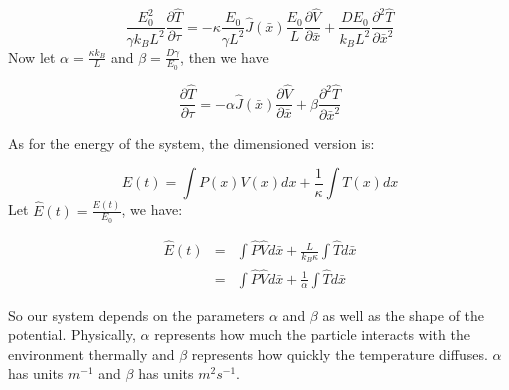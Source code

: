 \begin{equation}
\frac{E_0^2}{\gamma k_B L^2} \frac{\partial \hat{T}}{\partial \tau} = -\kappa \frac{E_0}{\gamma L^2}\hat{J}(\bar{x}) \frac{E_0}{L} \frac{\partial \hat{V}}{\partial \bar{x}} + \frac{D E_0}{k_B L^2} \frac{\partial^2 \hat{T}}{\partial \bar{x}^2}
\end{equation}
Now let $\alpha = \frac{\kappa k_B}{L}$ and $\beta = \frac{D \gamma}{E_0}$, then we have

\begin{equation}
\frac{\partial \hat{T}}{\partial \tau} = -\alpha \hat{J}(\bar{x}) \frac{\partial \hat{V}}{\partial \bar{x}} + \beta \frac{\partial^2 \hat{T}}{\partial \bar{x}^2} \label{eqn:dimensionlessHeat}
\end{equation}

As for the energy of the system, the dimensioned version is:

\begin{equation}
E(t) = \int P(x) V(x) dx + \frac{1}{\kappa} \int T(x) dx
\end{equation}
Let $\hat{E}(t) = \frac{E(t)}{E_0}$, we have:

\begin{eqnarray}
\hat{E}(t) & = & \int \hat{P} \hat{V} d \bar{x} + \frac{L}{k_B \kappa} \int \hat{T} d\bar{x} \\
              & = & \int \hat{P} \hat{V} d \bar{x} + \frac{1}{\alpha} \int \hat{T} d\bar{x}
\end{eqnarray}


So our system depends on the parameters $\alpha$ and $\beta$ as well as the shape of the potential. Physically, $\alpha$ represents how much the particle interacts with the environment thermally and $\beta$ represents how quickly the temperature diffuses. $\alpha$ has units $m^{-1}$ and $\beta$ has units $m^2 s^{-1}$.
